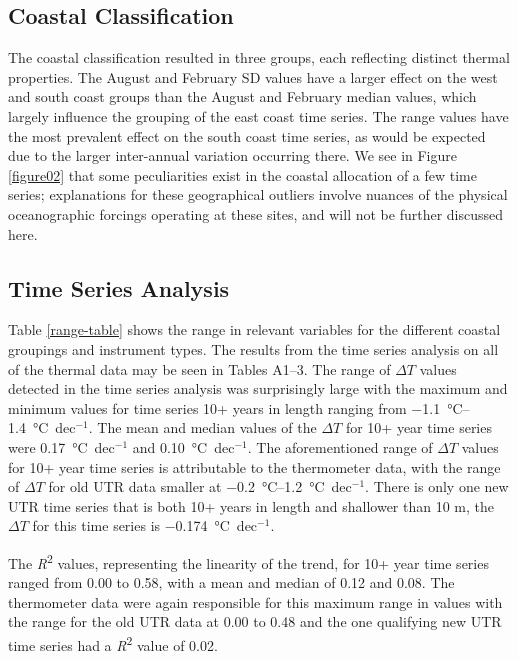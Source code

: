 \documentclass{ametsoc}
\begin{document}
\subsection{Coastal Classification}
The coastal classification resulted in three groups, each reflecting distinct thermal properties. The August and February SD values have a larger effect on the west and south coast groups than the August and February median values, which largely influence the grouping of the east coast time series. The range values have the most prevalent effect on the south coast time series, as would be expected due to the larger inter-annual variation occurring there. We see in Figure \ref{figure02} that some peculiarities exist in the coastal allocation of a few time series; explanations for these geographical outliers involve nuances of the physical oceanographic forcings operating at these sites, and will not be further discussed here.

\subsection{Time Series Analysis}
Table \ref{range-table} shows the range in relevant variables for the different coastal groupings and instrument types. The results from the time series analysis on all of the thermal data may be seen in Tables A1--3. The range of $\Delta T$ values detected in the time series analysis was surprisingly large with the maximum and minimum values for time series 10+ years in length ranging from \SIrange{-1.1}{1.4}{\degreeCelsius}~dec$^{-1}$. The mean and median values of the $\Delta T$ for 10+ year time series were \SI{0.17}{\degreeCelsius}~dec$^{-1}$ and \SI{0.10}{\degreeCelsius}~dec$^{-1}$. The aforementioned range of $\Delta T$ values for 10+ year time series is attributable to the thermometer data, with the range of $\Delta T$ for old UTR data smaller at \SIrange{-0.2}{1.2}{\degreeCelsius}~dec$^{-1}$. There is only one new UTR time series that is both 10+ years in length and shallower than 10 m, the $\Delta T$ for this time series is \SI{-0.174}{\degreeCelsius}~dec$^{-1}$.

The \emph{R}\textsuperscript{2} values, representing the linearity of the trend, for 10+ year time series ranged from 0.00 to 0.58, with a mean and median of 0.12 and 0.08. The thermometer data were again responsible for this maximum range in values with the range for the old UTR data at 0.00 to 0.48 and the one qualifying new UTR time series had a \emph{R}\textsuperscript{2} value of 0.02.
\end{document}
